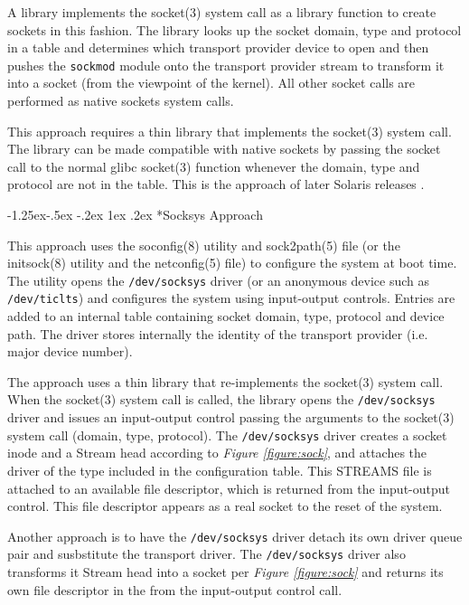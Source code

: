 \documentclass[letterpaper,final,notitlepage,twocolumn,10pt,twoside]{article}
\makeatletter
\renewcommand\subsubsection{\@startsection{subsubsection}{3}{\z@}%
                                     {-1.25ex\@plus -.5ex \@minus -.2ex}%
                                     {1ex \@plus .2ex}%
                                     {\normalfont\normalsize\bfseries}}
\makeatother
\begin{document}
A library implements the socket(3) system call as a library function to create
sockets in this fashion.  The library looks up the socket domain, type and
protocol in a table and determines which transport provider device to open and
then pushes the \texttt{sockmod} module onto the transport provider stream to
transform it into a socket (from the viewpoint of the kernel).  All other
socket calls are performed as native sockets system calls.

This approach requires a thin library that implements the socket(3) system
call.  The library can be made compatible with native sockets by passing the
socket call to the normal glibc socket(3) function whenever the domain, type
and protocol are not in the table.  This is the approach of later Solaris
releases \cite[]{socklib}.

\subsubsection*{Socksys Approach}

This approach uses the soconfig(8) utility and sock2path(5) file (or the
initsock(8) utility and the netconfig(5) file) to configure the system at boot
time.  The utility opens the \texttt{/dev/socksys} driver (or an anonymous
device such as \texttt{/dev/ticlts}) and configures the system using
input-output controls.  Entries are added to an internal table containing
socket domain, type, protocol and device path.  The driver stores internally
the identity of the transport provider (i.e. major device number).

The approach uses a thin library that re-implements the socket(3) system call.
When the socket(3) system call is called, the library opens the
\texttt{/dev/socksys} driver and issues an input-output control passing the
arguments to the socket(3) system call (domain, type, protocol).  The
\texttt{/dev/socksys} driver creates a socket inode and a Stream head
according to \textit{Figure \ref{figure:sock}}, and attaches the driver of the
type included in the configuration table.  This STREAMS file is attached to an
available file descriptor, which is returned from the input-output control.
This file descriptor appears as a real socket to the reset of the system.

Another approach is to have the \texttt{/dev/socksys} driver detach its own
driver queue pair and susbstitute the transport driver.  The
\texttt{/dev/socksys} driver also transforms it Stream head into a socket per
\textit{Figure \ref{figure:sock}} and returns its own file descriptor in
the from the input-output control call.
\end{document}
